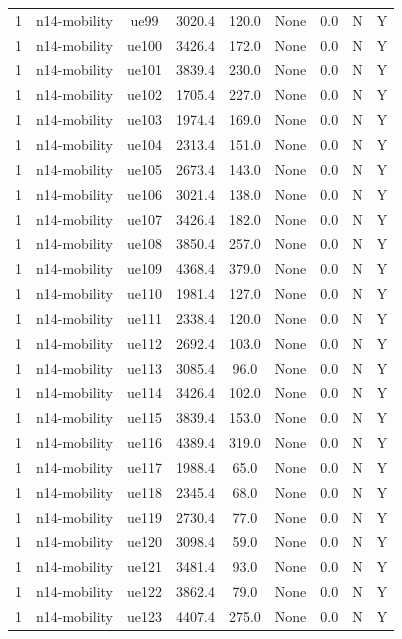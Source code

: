 \begin{table}[ht]
\begin{tabular}{|c|c|c|c|c|c|c|c|c|}
1 & n14-mobility & ue99 & 3020.4 & 120.0 & None & 0.0 & N & Y \\
1 & n14-mobility & ue100 & 3426.4 & 172.0 & None & 0.0 & N & Y \\
1 & n14-mobility & ue101 & 3839.4 & 230.0 & None & 0.0 & N & Y \\
1 & n14-mobility & ue102 & 1705.4 & 227.0 & None & 0.0 & N & Y \\
1 & n14-mobility & ue103 & 1974.4 & 169.0 & None & 0.0 & N & Y \\
1 & n14-mobility & ue104 & 2313.4 & 151.0 & None & 0.0 & N & Y \\
1 & n14-mobility & ue105 & 2673.4 & 143.0 & None & 0.0 & N & Y \\
1 & n14-mobility & ue106 & 3021.4 & 138.0 & None & 0.0 & N & Y \\
1 & n14-mobility & ue107 & 3426.4 & 182.0 & None & 0.0 & N & Y \\
1 & n14-mobility & ue108 & 3850.4 & 257.0 & None & 0.0 & N & Y \\
1 & n14-mobility & ue109 & 4368.4 & 379.0 & None & 0.0 & N & Y \\
1 & n14-mobility & ue110 & 1981.4 & 127.0 & None & 0.0 & N & Y \\
1 & n14-mobility & ue111 & 2338.4 & 120.0 & None & 0.0 & N & Y \\
1 & n14-mobility & ue112 & 2692.4 & 103.0 & None & 0.0 & N & Y \\
1 & n14-mobility & ue113 & 3085.4 & 96.0 & None & 0.0 & N & Y \\
1 & n14-mobility & ue114 & 3426.4 & 102.0 & None & 0.0 & N & Y \\
1 & n14-mobility & ue115 & 3839.4 & 153.0 & None & 0.0 & N & Y \\
1 & n14-mobility & ue116 & 4389.4 & 319.0 & None & 0.0 & N & Y \\
1 & n14-mobility & ue117 & 1988.4 & 65.0 & None & 0.0 & N & Y \\
1 & n14-mobility & ue118 & 2345.4 & 68.0 & None & 0.0 & N & Y \\
1 & n14-mobility & ue119 & 2730.4 & 77.0 & None & 0.0 & N & Y \\
1 & n14-mobility & ue120 & 3098.4 & 59.0 & None & 0.0 & N & Y \\
1 & n14-mobility & ue121 & 3481.4 & 93.0 & None & 0.0 & N & Y \\
1 & n14-mobility & ue122 & 3862.4 & 79.0 & None & 0.0 & N & Y \\
1 & n14-mobility & ue123 & 4407.4 & 275.0 & None & 0.0 & N & Y \\

\end{tabular}
\end{table}
